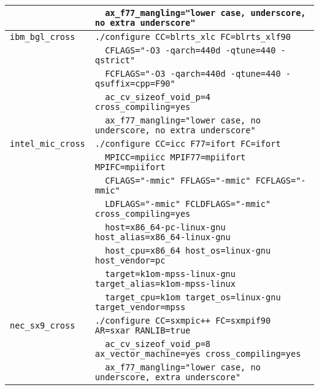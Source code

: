 \documentclass[a4paper]{jarticle}
\begin{document}
\begin{table}[htbp]
\begin{center}
\begin{tabular}{|l|l|}
                          & \verb+  ax_f77_mangling="lower case, underscore, no extra underscore" + \\ \hline
\verb+ibm_bgl_cross+      & \verb+./configure CC=blrts_xlc FC=blrts_xlf90+ \\
                          & \verb+  CFLAGS="-O3 -qarch=440d -qtune=440 -qstrict"+ \\
                          & \verb+  FCFLAGS="-O3 -qarch=440d -qtune=440 -qsuffix=cpp=F90"+ \\
                          & \verb+  ac_cv_sizeof_void_p=4 cross_compiling=yes+\\
                          & \verb+  ax_f77_mangling="lower case, no underscore, no extra underscore"+ \\ \hline
\verb+intel_mic_cross+    & \verb+./configure CC=icc F77=ifort FC=ifort+ \\
                          & \verb+  MPICC=mpiicc MPIF77=mpiifort MPIFC=mpiifort+ \\
                          & \verb+  CFLAGS="-mmic" FFLAGS="-mmic" FCFLAGS="-mmic"+ \\
                          & \verb+  LDFLAGS="-mmic" FCLDFLAGS="-mmic" cross_compiling=yes+ \\
                          & \verb+  host=x86_64-pc-linux-gnu host_alias=x86_64-linux-gnu+ \\
                          & \verb+  host_cpu=x86_64 host_os=linux-gnu host_vendor=pc+ \\
                          & \verb+  target=k1om-mpss-linux-gnu target_alias=k1om-mpss-linux+ \\
                          & \verb+  target_cpu=k1om target_os=linux-gnu target_vendor=mpss+ \\ \hline
\verb+nec_sx9_cross+      & \verb|./configure CC=sxmpic++ FC=sxmpif90 AR=sxar RANLIB=true | \\
                          & \verb+  ac_cv_sizeof_void_p=8 ax_vector_machine=yes cross_compiling=yes+ \\ 
                          & \verb+  ax_f77_mangling="lower case, no underscore, extra underscore"+ \\ \hline
\end{tabular}
\end{center}
\end{table}
\end{document}
